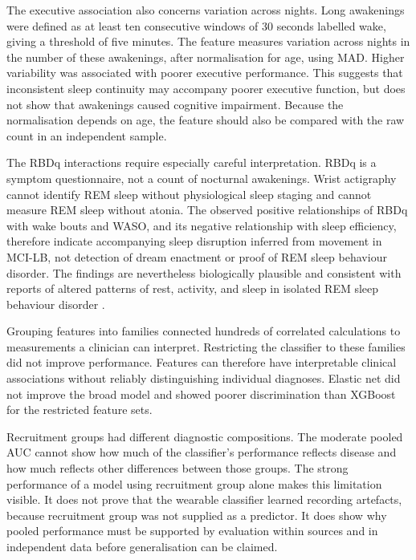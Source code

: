 \documentclass[referee,pdflatex,sn-vancouver-num]{sn-jnl}
\begin{document}
The executive association also concerns variation across nights. Long
awakenings were defined as at least ten consecutive windows of 30 seconds
labelled wake, giving a threshold of five minutes. The feature measures
variation across nights in the number of these awakenings, after normalisation
for age, using MAD. Higher variability was associated with poorer executive
performance. This suggests that inconsistent sleep continuity may accompany
poorer executive function, but does not show that awakenings caused cognitive
impairment. Because the normalisation depends on age, the feature should also
be compared with the raw count in an independent sample.

The RBDq interactions require especially careful interpretation. RBDq is a
symptom questionnaire, not a count of nocturnal awakenings. Wrist actigraphy
cannot identify REM sleep without physiological sleep staging and cannot
measure REM sleep without atonia. The observed positive relationships of RBDq
with wake bouts and WASO, and its negative relationship with sleep efficiency,
therefore indicate accompanying sleep disruption inferred from movement in MCI-LB,
not detection of dream enactment or proof of REM sleep behaviour disorder. The
findings are nevertheless biologically plausible and consistent with reports
of altered patterns of rest, activity, and sleep in isolated REM sleep
behaviour disorder \cite{stefani2018screening,winer2023restactivity,ophey2025accelerometry}.

Grouping features into families connected hundreds of correlated calculations
to measurements a clinician can interpret. Restricting the classifier to these
families did not improve performance. Features can therefore have interpretable
clinical associations without reliably distinguishing individual diagnoses.
Elastic net did not improve the broad model and showed poorer discrimination
than XGBoost for the restricted feature sets.

Recruitment groups had different diagnostic compositions. The moderate pooled
AUC cannot show how much of the classifier's performance reflects disease
and how much reflects other differences between those groups. The strong
performance of a model using recruitment group alone makes this limitation
visible. It does not prove that the wearable classifier learned recording
artefacts, because recruitment group was not supplied as a predictor. It does
show why pooled performance must be supported by evaluation within sources
and in independent data before generalisation can be claimed.
\end{document}

